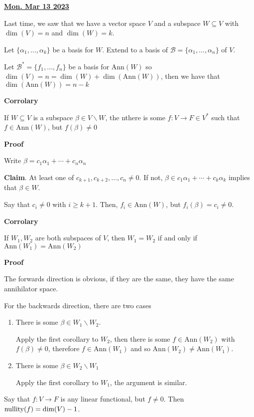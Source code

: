 \documentclass[12pt]{article}
\renewcommand{\date}[1]{\underline{\bf #1}}
\def\Ann{\text{Ann}}
\def\B{\mathcal B}
\begin{document}
  \date {Mon. Mar 13 2023}


  Last time, we saw that we have a vector space $V$ and a subspace $W
  \subseteq V$ with $\dim(V) = n$ and $\dim(W) = k$.

  Let $\{\alpha_1, \dots, \alpha_k\}$ be a basis for $W$. Extend to a basis of
  $\B = \{\alpha_1, \dots, \alpha_n\}$ of $V$.

  Let $\B^* = \{f_1, \dots, f_n\}$ be a basis for $\Ann(W)$ so $\dim(V) = n =
  \dim(W) + \dim(\Ann(W))$, then we have that $\dim(\Ann(W)) = n - k$


  {\bf Corrolary}

  If $W \subseteq V$ is a subspace $\beta \in V \backslash W$, the nthere is
  some $f: V \to F \in V^*$  such that $f \in \Ann(W)$, but $f(\beta) \ne 0$

  {\bf Proof}

  Write $\beta = c_1 \alpha_1 + \cdots + c_n \alpha_n$

  {\bf Claim}. At least one of $c_{k + 1}, c_{k + 2}, \dots, c_n \ne 0$. If not,
  $\beta \in c_1 \alpha_1 + \cdots + c_k \alpha_k$ implies that $\beta \in W$.

  Say that $c_i \ne 0$ with $i \ge k + 1$. Then, $f_i \in \Ann(W)$, but
  $f_i(\beta) = c_i \ne 0$.


  {\bf Corrolary}

  If $W_1, W_2$ are both subspaces of $V$, then $W_1 = W_2$ if and only if
  $\Ann(W_1) = \Ann(W_2)$

  {\bf Proof}

  The forwards direction is obvious, if they are the same, they have the same
  annihilator space.

  For the backwards direction, there are two cases

  \begin{enumerate}
    \item There is some $\beta \in W_1 \backslash W_2$.

      Apply the first corollary to $W_2$, then there is some $f \in \Ann(W_2)$
      with $f(\beta) \ne 0$, therefore $f \in \Ann(W_1)$ and so $\Ann(W_2) \ne
      \Ann(W_1)$.

    \item There is some $\beta \in W_2 \backslash W_1$

      Apply the first corollary to $W_1$, the argument is similar.
  \end{enumerate}

  Say that $f: V \to F$ is any linear functional, but $f \ne 0$. Then
  $\mathrm{nullity}(f) = \dim(V) - 1$.
\end{document}

